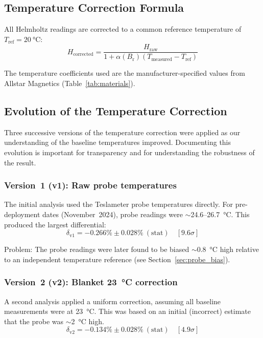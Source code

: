 \documentclass[11pt,letterpaper]{article}
\newcommand{\Br}{B_\mathrm{r}}
\newcommand{\alphar}{\alpha(\Br)}
\begin{document}
\subsection{Temperature Correction Formula}

All Helmholtz readings are corrected to a common reference temperature of
$T_\mathrm{ref} = \SI{20}{\celsius}$:
\begin{equation}
    H_\mathrm{corrected} = \frac{H_\mathrm{raw}}{1 + \alphar (T_\mathrm{measured} - T_\mathrm{ref})}
    \label{eq:temp_correction}
\end{equation}

The temperature coefficients used are the manufacturer-specified values from
Allstar Magnetics (Table~\ref{tab:materials}).

\subsection{Evolution of the Temperature Correction}
\label{sec:temp_history}

Three successive versions of the temperature correction were applied as our
understanding of the baseline temperatures improved. Documenting this evolution
is important for transparency and for understanding the robustness of the
result.

\subsubsection{Version~1 (v1): Raw probe temperatures}

The initial analysis used the Teslameter probe temperatures directly. For
pre-deployment dates (November~2024), probe readings were $\sim$24.6--\SI{26.7}{\celsius}. This
produced the largest differential:
\begin{equation*}
    \delta_\mathrm{v1} = -0.266\% \pm 0.028\%~(\mathrm{stat}) \quad [9.6\sigma]
\end{equation*}

Problem: The probe readings were later found to be biased
$\sim$\SI{0.8}{\celsius} high relative to an independent temperature reference
(see Section~\ref{sec:probe_bias}).

\subsubsection{Version~2 (v2): Blanket \SI{23}{\celsius} correction}

A second analysis applied a uniform correction, assuming all baseline
measurements were at \SI{23}{\celsius}. This was based on an initial (incorrect)
estimate that the probe was $\sim$\SI{2}{\celsius} high.
\begin{equation*}
    \delta_\mathrm{v2} = -0.134\% \pm 0.028\%~(\mathrm{stat}) \quad [4.9\sigma]
\end{equation*}
\end{document}
